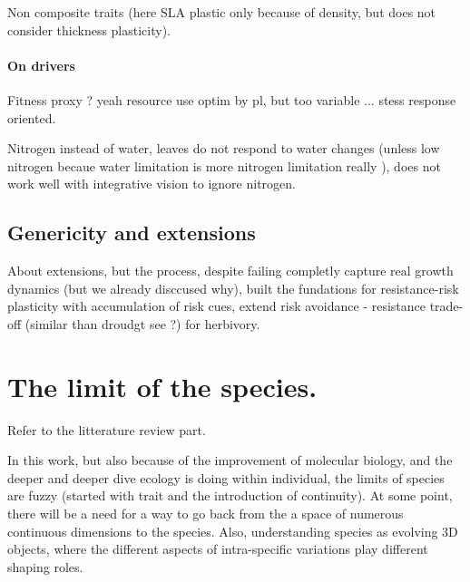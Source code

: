 Non composite traits (here SLA plastic only because of density, but does not consider thickness plasticity).

\paragraph{On drivers}

Fitness proxy ? yeah \cite{ryser_consequences_2000} resource use optim by pl, but \cite{franklin_modeling_2012} too variable ... stess response oriented. 


Nitrogen instead of water, leaves do not respond to water changes (unless low nitrogen becaue water limitation is more nitrogen limitation really \parencite{farrior_competitive_2014}), does not work well with integrative vision to ignore nitrogen.


\subsection{Genericity and extensions}

About extensions, but the process, despite failing completly capture real growth dynamics (but we already disccused why), built the fundations for resistance-risk plasticity with accumulation of risk cues, extend risk avoidance - resistance trade-off (similar than droudgt see \cite{kooyers_evolution_2015}?) for herbivory.

\section{The limit of the species.}

Refer to the litterature review part.

In this work, but also because of the improvement of molecular biology, and the deeper and deeper dive ecology is doing within individual, the limits of species are fuzzy (started with trait and the introduction of continuity). At some point, there will be a need for a way to go back from the a space of numerous continuous dimensions to the species. Also, understanding species as evolving 3D objects, where the different aspects of intra-specific variations play different shaping roles.